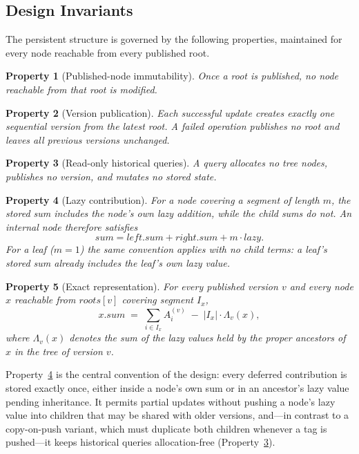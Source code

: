\documentclass[conference]{IEEEtran}
\newtheorem{property}{Property}
\begin{document}
\subsection{Design Invariants}
\label{sec:properties}

The persistent structure is governed by the following properties, maintained for every node
reachable from every published root.

\begin{property}[Published-node immutability]
\label{prop:immutable}
Once a root is published, no node reachable from that root is modified.
\end{property}

\begin{property}[Version publication]
\label{prop:publication}
Each successful update creates exactly one sequential version from the latest root. A failed
operation publishes no root and leaves all previous versions unchanged.
\end{property}

\begin{property}[Read-only historical queries]
\label{prop:readonly}
A query allocates no tree nodes, publishes no version, and mutates no stored state.
\end{property}

\begin{property}[Lazy contribution]
\label{prop:lazy}
For a node covering a segment of length $m$, the stored sum includes the node's own lazy
addition, while the child sums do not. An internal node therefore satisfies
\[
\textit{sum}
= \textit{left.sum} + \textit{right.sum} + m \cdot \textit{lazy}.
\]
For a leaf ($m = 1$) the same convention applies with no child terms: a leaf's stored sum
already includes the leaf's own lazy value.
\end{property}

\begin{property}[Exact representation]
\label{prop:exact}
For every published version $v$ and every node $x$ reachable from $\textit{roots}[v]$ covering
segment $I_x$,
\[
x.\textit{sum} \;=\; \sum_{i \in I_x} A^{(v)}_i \;-\; |I_x| \cdot \Lambda_v(x),
\]
where $\Lambda_v(x)$ denotes the sum of the lazy values held by the proper ancestors of $x$ in
the tree of version $v$.
\end{property}

Property~\ref{prop:lazy} is the central convention of the design: every deferred contribution is
stored exactly once, either inside a node's own sum or in an ancestor's lazy value pending
inheritance. It permits partial updates without pushing a node's lazy value into children that may
be shared with older versions, and---in contrast to a copy-on-push variant, which must duplicate
both children whenever a tag is pushed---it keeps historical queries allocation-free
(Property~\ref{prop:readonly}).
\end{document}
